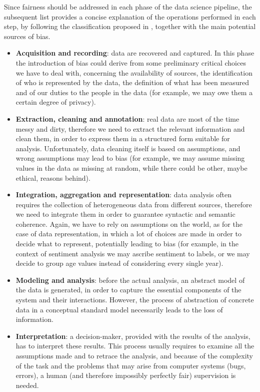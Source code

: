 Since fairness should be addressed in each phase of the data science pipeline, the subsequent list provides a concise explanation of the operations performed in each step, by following the classification proposed in \cite{jagadish2014big}, together with the main potential sources of bias.
\begin{itemize}
\item \textbf{Acquisition and recording}: data are recovered and captured. In this phase the introduction of bias could derive from some preliminary critical choices we have to deal with, concerning the availability of sources, the identification of who is represented by the data, the definition of what has been measured and of our duties to the people in the data (for example, we may owe them a certain degree of privacy).
\item \textbf{Extraction, cleaning and annotation}: real data are most of the time messy and dirty, therefore we need to extract the relevant information and clean them, in order to express them in a structured form suitable for analysis. Unfortunately, data cleaning itself is based on assumptions, and wrong assumptions may lead to bias (for example, we may assume missing values in the data as missing at random, while there could be other, maybe ethical, reasons behind).
\item \textbf{Integration, aggregation and representation}: data analysis often requires the collection of heterogeneous data from different sources, therefore we need to integrate them in order to guarantee syntactic and semantic coherence. Again, we have to rely on assumptions on the world, as for the case of data representation, in which a lot of choices are made in order to decide what to represent, potentially leading to bias (for example, in the context of sentiment analysis we may ascribe sentiment to labels, or we may decide to group age values instead of considering every single year).
\item \textbf{Modeling and analysis}: before the actual analysis, an abstract model of the data is generated, in order to capture the essential components of the system and their interactions. However, the process of abstraction of concrete data in a conceptual standard model necessarily leads to the loss of information.
\item \textbf{Interpretation}: a decision-maker, provided with the results of the analysis, has to interpret these results. This process usually requires to examine all the assumptions made and to retrace the analysis, and because of the complexity of the task and the problems that may arise from computer systems (bugs, errors), a human (and therefore impossibly perfectly fair) supervision is needed.
\end{itemize}


